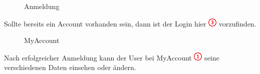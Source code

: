 \documentclass[11pt,ngerman]{article}
\begin{document}
    \begin{figure}[H]
    	\centering
    	\caption{Anmeldung}
    	\label{fig:Anmeldung}
    \end{figure}
    
    Sollte bereits ein Account vorhanden sein, dann ist der Login hier \includegraphics{figures/3.png} vorzufinden.
    
    \begin{figure}[H]
    	\centering
    	\caption{MyAccount}
    	\label{fig:MyAccount}
    \end{figure}
    
    
    Nach erfolgreicher Anmeldung kann der User bei MyAccount \includegraphics{figures/1.png} seine verschiedenen Daten einsehen oder ändern. 
    
    
    
    
    
\end{document}
